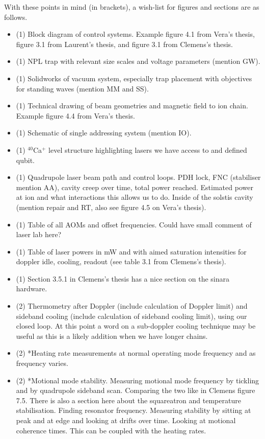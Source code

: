 \documentclass{report}
\begin{document}
\noindent With these points in mind (in brackets), a wish-list for figures and sections are as follows.
\begin{itemize}
    \item (1) Block diagram of control systems. Example figure 4.1 from Vera's thesis, figure 3.1 from Laurent's thesis, and figure 3.1 from Clemens's thesis.
    \item (1) NPL trap with relevant size scales and voltage parameters (mention GW).
    \item (1) Solidworks of vacuum system, especially trap placement with objectives for standing waves (mention MM and SS).
    \item (1) Technical drawing of beam geometries and magnetic field to ion chain. Example figure 4.4 from Vera's thesis.
    \item (1) Schematic of single addressing system (mention IO).
    \item (1) $^{40}$Ca$^+$ level structure highlighting lasers we have access to and defined qubit.
    \item (1) Quadrupole laser beam path and control loops. PDH lock, FNC (stabiliser mention AA), cavity creep over time, total power reached. Estimated power at ion and what interactions this allows us to do. Inside of the solstis cavity (mention repair and RT, also see figure 4.5 on Vera's thesis).
    \item (1) Table of all AOMs and offset frequencies. Could have small comment of laser lab here?
    \item (1) Table of laser powers in mW and with aimed saturation intensities for doppler idle, cooling, readout (see table 3.1 from Clemens's thesis).
    \item (1) Section 3.5.1 in Clemens's thesis has a nice section on the sinara hardware.
    \item (2) Thermometry after Doppler (include calculation of Doppler limit) and sideband cooling (include calculation of sideband cooling limit), using our closed loop. At this point a word on a sub-doppler cooling technique may be useful as this is a likely addition when we have longer chains.
    \item (2) *Heating rate measurements at normal operating mode frequency and as frequency varies.
    \item (2) *Motional mode stability. Measuring motional mode frequency by tickling and by quadrupole sideband scan. Comparing the two like in Clemens figure 7.5. There is also a section here about the squareatron and temperature stabilisation. Finding resonator frequency. Measuring stability by sitting at peak and at edge and looking at drifts over time. Looking at motional coherence times. This can be coupled with the heating rates.

\end{itemize}
\end{document}
